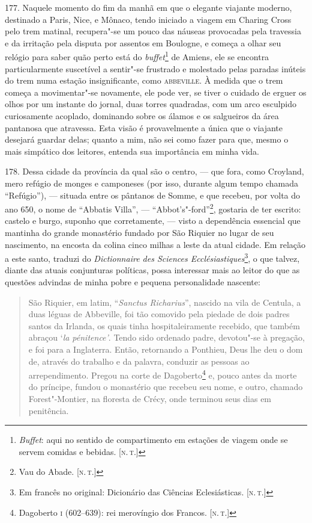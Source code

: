 177. Naquele momento do fim da manhã em que o elegante viajante moderno,
destinado a Paris, Nice, e Mônaco, tendo iniciado a viagem em Charing
Cross pelo trem matinal, recupera"-se um pouco das náuseas provocadas
pela travessia e da irritação pela disputa por assentos em Boulogne, e
começa a olhar seu relógio para saber quão perto está do
\emph{buffet}\footnote{\emph{Buffet}: aqui no sentido de compartimento
  em estações de viagem onde se servem comidas e bebidas. {[}\textsc{n.\,t.}{]}}
de Amiens, ele se encontra particularmente suscetível a sentir"-se
frustrado e molestado pelas paradas inúteis do trem numa estação
insignificante, como \textsc{abbeville}. À medida que o trem começa a
movimentar"-se novamente, ele pode ver, se tiver o cuidado de erguer os
olhos por um instante do jornal, duas torres quadradas, com um arco
esculpido curiosamente acoplado, dominando sobre os álamos e os
salgueiros da área pantanosa que atravessa. Esta visão é provavelmente a
única que o viajante desejará guardar delas; quanto a mim, não sei como
fazer para que, mesmo o mais simpático dos leitores, entenda sua
importância em minha vida.

178. Dessa cidade da província da qual são o centro, --- que fora, como
Croyland, mero refúgio de monges e camponeses (por isso, durante algum
tempo chamada ``Refúgio''), --- situada entre os pântanos de Somme, e que
recebeu, por volta do ano 650, o nome de ``Abbatis Villa'', ---
``Abbot's"-ford''\footnote{Vau do Abade. {[}\textsc{n.\,t.}{]}}, gostaria de
ter escrito: castelo e burgo, suponho que corretamente, --- visto a
dependência essencial que mantinha do grande monastério fundado por São
Riquier no lugar de seu nascimento, na encosta da colina cinco milhas a
leste da atual cidade. Em relação a este santo, traduzi do
\emph{Dictionnaire des Sciences Ecclésiastiques}\footnote{Em francês no
  original: Dicionário das Ciências Eclesiásticas. {[}\textsc{n.\,t.}{]}}, o
que talvez, diante das atuais conjunturas políticas, possa interessar
mais ao leitor do que as questões advindas de minha pobre e pequena
personalidade nascente: %

\begin{quote}
São Riquier, em latim, ``\emph{Sanctus Richarius}'', nascido na vila
de Centula, a duas léguas de Abbeville, foi tão comovido pela piedade de
dois padres santos da Irlanda, os quais tinha hospitaleiramente
recebido, que também abraçou `\emph{la pénitence'}. Tendo sido ordenado
padre, devotou"-se à pregação, e foi para a Inglaterra. Então, retornando
a Ponthieu, Deus lhe deu o dom de, através do trabalho e da palavra,
conduzir as pessoas ao arrependimento. Pregou na corte de
Dagoberto\footnote{Dagoberto \textsc{i} (602--639): rei merovíngio dos Francos.
  {[}\textsc{n.\,t.}{]}} e, pouco antes da morte do príncipe, fundou o
monastério que recebeu seu nome, e outro, chamado Forest"-Montier, na
floresta de Crécy, onde terminou seus dias em penitência.
\end{quote}

